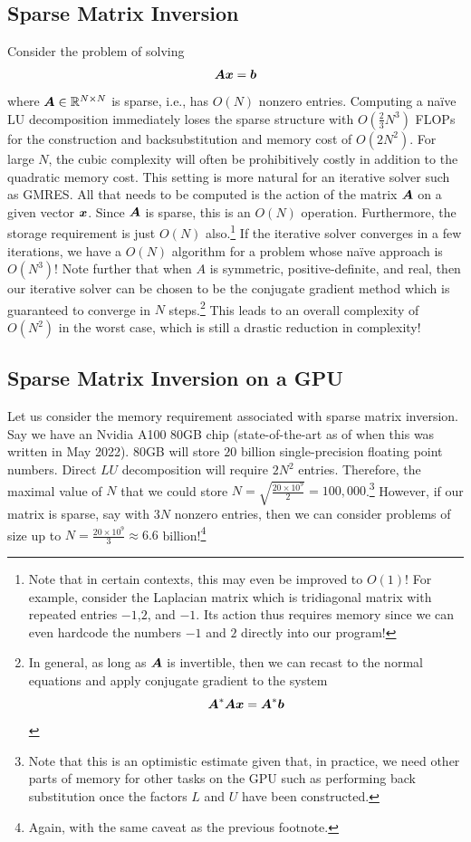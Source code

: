 \subsection{Sparse Matrix Inversion}
Consider the problem of solving 
\begin{equation} \label{eqn:18:sparse}
\boldsymbol{A} \boldsymbol{x} = \boldsymbol{b}
\end{equation}
where $\boldsymbol{A} \in \mathbb{R}^{N \times N}$ is sparse, i.e., has $O(N)$ nonzero entries. Computing a na\"{i}ve LU decomposition immediately loses the sparse structure with $O(\frac{2}{3}N^3)$ FLOPs for the construction and backsubstitution and memory cost of $O(2N^2)$. For large $N$, the cubic complexity will often be prohibitively costly in addition to the quadratic memory cost. This setting is more natural for an iterative solver such as GMRES. All that needs to be computed is the action of the matrix $\boldsymbol{A}$ on a given vector $\boldsymbol{x}$. Since $\boldsymbol{A}$ is sparse, this is an $O(N)$ operation. Furthermore, the storage requirement is just $O(N)$ also.\footnote{Note that in certain contexts, this may even be improved to $O(1)$! For example, consider the Laplacian matrix which is tridiagonal matrix with repeated entries $-1$,$2$, and $-1$. Its action thus requires  memory since we can even hardcode the numbers $-1$ and $2$ directly into our program!}
If the iterative solver converges in a few iterations, we have a $O(N)$ algorithm for a problem whose na\"{i}ve approach is $O(N^3)$! Note further that when $A$ is symmetric, positive-definite, and real, then our iterative solver can be chosen to be the conjugate gradient method which is guaranteed to converge in $N$ steps.\footnote{In general, as long as $\boldsymbol{A}$ is invertible, then we can recast to the normal equations and apply conjugate gradient to the system
\begin{equation*}
    \boldsymbol{A}^{*} \boldsymbol{A} \boldsymbol{x} = \boldsymbol{A}^{*}\boldsymbol{b}
\end{equation*}
} 
This leads to an overall complexity of $O(N^2)$ in the worst case, which is still a drastic reduction in complexity!

\subsection{Sparse Matrix Inversion on a GPU}
Let us consider the memory requirement associated with sparse matrix inversion. Say we have an Nvidia A100 80GB chip (state-of-the-art as of when this was written in May 2022). 80GB will store $20$ billion single-precision floating point numbers. Direct $LU$ decomposition will require $2N^2$ entries. Therefore, the maximal value of $N$ that we could store $N = \sqrt{\frac{20 \times 10^9}{2}} = 100,000$.\footnote{Note that this is an optimistic estimate given that, in practice, we need other parts of memory for other tasks on the GPU such as performing back substitution once the factors $L$ and $U$ have been constructed.} However, if our matrix is sparse, say with $3N$ nonzero entries, then we can consider problems of size up to $N = \frac{20 \times 10^{9}}{3} \approx 6.6$ billion!\footnote{Again, with the same caveat as the previous footnote.} 

